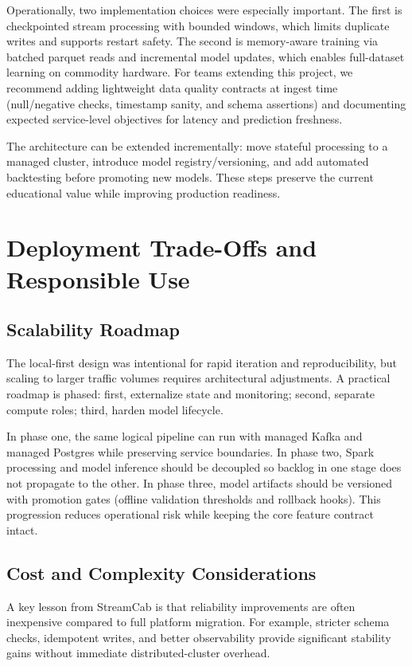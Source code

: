 \documentclass[conference]{IEEEtran}
\begin{document}
Operationally, two implementation choices were especially important. The first is checkpointed stream processing with bounded windows, which limits duplicate writes and supports restart safety. The second is memory-aware training via batched parquet reads and incremental model updates, which enables full-dataset learning on commodity hardware. For teams extending this project, we recommend adding lightweight data quality contracts at ingest time (null/negative checks, timestamp sanity, and schema assertions) and documenting expected service-level objectives for latency and prediction freshness.

The architecture can be extended incrementally: move stateful processing to a managed cluster, introduce model registry/versioning, and add automated backtesting before promoting new models. These steps preserve the current educational value while improving production readiness.

\section{Deployment Trade-Offs and Responsible Use}
\subsection{Scalability Roadmap}
The local-first design was intentional for rapid iteration and reproducibility, but scaling to larger traffic volumes requires architectural adjustments. A practical roadmap is phased: first, externalize state and monitoring; second, separate compute roles; third, harden model lifecycle.

In phase one, the same logical pipeline can run with managed Kafka and managed Postgres while preserving service boundaries. In phase two, Spark processing and model inference should be decoupled so backlog in one stage does not propagate to the other. In phase three, model artifacts should be versioned with promotion gates (offline validation thresholds and rollback hooks). This progression reduces operational risk while keeping the core feature contract intact.

\subsection{Cost and Complexity Considerations}
A key lesson from StreamCab is that reliability improvements are often inexpensive compared to full platform migration. For example, stricter schema checks, idempotent writes, and better observability provide significant stability gains without immediate distributed-cluster overhead.
\end{document}
